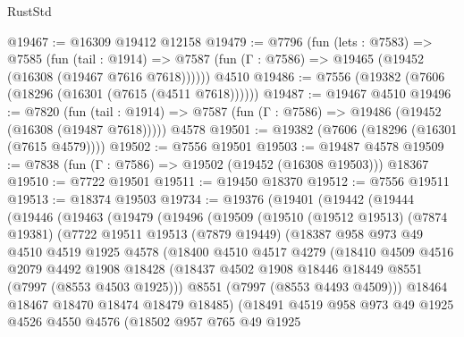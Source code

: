\begin{lexlean}{RustStd}
\begin{coremodule}
@19467 := @16309 @19412 @12158
@19479 := @7796
    (fun (lets : @7583) =>
    @7585
      (fun (tail : @1914) =>
      @7587 (fun (Γ : @7586) => @19465 (@19452 (@16308 (@19467 @7616 @7618))))))
    @4510
@19486 := @7556 (@19382 (@7606 (@18296 (@16301 (@7615 (@4511 @7618))))))
@19487 := @19467 @4510
@19496 := @7820
    (fun (tail : @1914) => @7587 (fun (Γ : @7586) => @19486 (@19452 (@16308 (@19487 @7618)))))
    @4578
@19501 := @19382 (@7606 (@18296 (@16301 (@7615 @4579))))
@19502 := @7556 @19501
@19503 := @19487 @4578
@19509 := @7838 (fun (Γ : @7586) => @19502 (@19452 (@16308 @19503))) @18367
@19510 := @7722 @19501
@19511 := @19450 @18370
@19512 := @7556 @19511
@19513 := @18374 @19503
@19734 := @19376
    (@19401
      (@19442
        (@19444
          (@19446
            (@19463
              (@19479
                (@19496
                  (@19509
                    (@19510
                      (@19512 @19513)
                      (@7874 @19381)
                      (@7722
                        @19511
                        @19513
                        (@7879 @19449)
                        (@18387
                          @958
                          @973
                          @49
                          @4510
                          @4519
                          @1925
                          @4578
                          (@18400
                            @4510
                            @4517
                            @4279
                            (@18410
                              @4509
                              @4516
                              @2079
                              @4492
                              @1908
                              @18428
                              (@18437 @4502 @1908 @18446 @18449 @8551 (@7997 (@8553 @4503 @1925)))
                              @8551
                              (@7997 (@8553 @4493 @4509)))
                            @18464
                            @18467
                            @18470
                            @18474
                            @18479
                            @18485)
                          (@18491
                            @4519
                            @958
                            @973
                            @49
                            @1925
                            @4526
                            @4550
                            @4576
                            (@18502
                              @957
                              @765
                              @49
                              @1925

\end{coremodule}
\end{lexlean}
